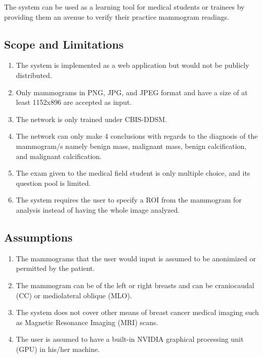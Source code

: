 	The system can be used as a learning tool for medical students or trainees by providing them an avenue to verify their practice mammogram readings.

\subsection{Scope and Limitations}
\begin{enumerate}
	\item The system is implemented as a web application but would not be publicly distributed.
	\item Only mammograms in PNG, JPG, and JPEG format and have a size of at least 1152x896 are accepted as input.
	\item The network is only trained under CBIS-DDSM.
	\item The network can only make 4 conclusions with regards to the diagnosis of the mammogram/s namely benign mass, malignant mass, benign calcification, and  malignant calcification.
	\item The exam given to the medical field student is only multiple choice, and its question pool is limited.
	\item The system requires the user to specify a ROI from the mammogram for analysis instead of having the whole image analyzed.
\end{enumerate}

\subsection{Assumptions}
\begin{enumerate}
	\item The mammograms that the user would input is assumed to be anonimized or permitted by the patient.
	\item The mammogram can be of the left or right breasts and can be craniocaudal (CC) or mediolateral oblique (MLO).
	\item The system does not cover other means of breast cancer medical imaging such as Magnetic Resonance Imaging (MRI) scans.
	\item The user is assumed to have a built-in NVIDIA graphical processing unit (GPU) in his/her machine.
\end{enumerate}